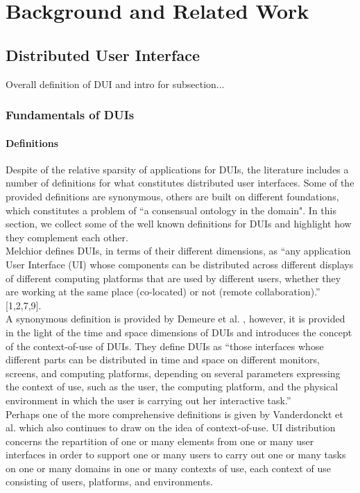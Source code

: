 \chapter{Background and Related Work}\label{chapter:litreview}
\section{Distributed User Interface}
Overall definition of DUI and intro for subsection...
\subsection{Fundamentals of DUIs}
\subsubsection{Definitions}
Despite of the relative sparsity of applications for DUIs, the literature
includes a number of definitions for what constitutes distributed user interfaces. Some of the provided definitions are synonymous, others are
built on different foundations, which constitutes a problem of ``a consensual
ontology in the domain"\cite{vanderdonckt2010distributed}. In this section, we
collect some of the well known definitions for DUIs and highlight how they
complement each other.\\

Melchior \cite{melchior2011distributed} defines DUIs, in terms of their
different dimensions, as ``any application User Interface (UI) whose components
can be distributed across different displays of different computing platforms that are used by different users, whether they are working at the same place (co-located) or not (remote collaboration).'' [1,2,7,9].\\

A synonymous definition is provided by Demeure et al. \cite{demeure20084c},
however, it is provided in the light of the time and space dimensions of DUIs
and introduces the concept of the context-of-use of DUIs.
They define DUIs as ``those interfaces whose different parts can be distributed in time and space on different monitors, screens, and computing platforms, depending on several parameters expressing the context of use, such as the user, the computing platform, and the physical environment in which the user is carrying out her interactive task.'' \\ 

Perhaps one of the more comprehensive definitions is given by Vanderdonckt et
al. \cite{vanderdonckt2010distributed} which also continues to draw on the idea of context-of-use. UI distribution
concerns the repartition of one or many elements from one or many user interfaces in order to support one or many users to carry out one or many tasks on one or many domains in one or many contexts of use, each context of use consisting of users, platforms, and environments.\\

